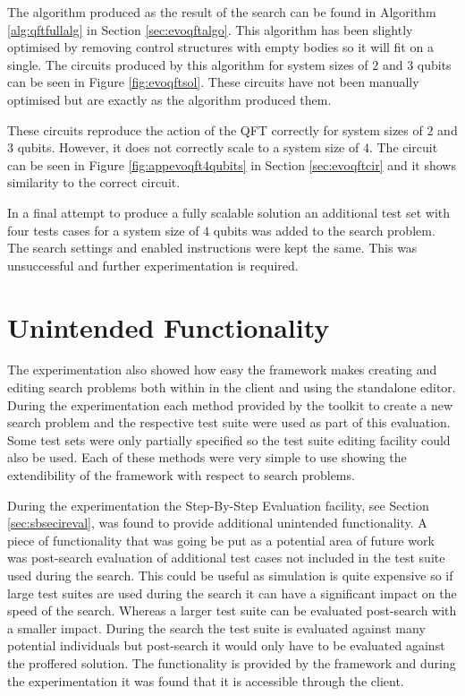The algorithm produced as the result of the search can be found in Algorithm \ref{alg:qftfullalg} in Section \ref{sec:evoqftalgo}.
This algorithm has been slightly optimised by removing control structures with empty bodies so it will fit on a single.
The circuits produced by this algorithm for system sizes of $2$ and $3$ qubits can be seen in Figure \ref{fig:evoqftsol}.
These circuits have not been manually optimised but are exactly as the algorithm produced them.

These circuits reproduce the action of the QFT correctly for system sizes of $2$ and $3$ qubits.
However, it does not correctly scale to a system size of $4$.
The circuit can be seen in Figure \ref{fig:appevoqft4qubits} in Section \ref{sec:evoqftcir} and it shows similarity to the correct circuit.

In a final attempt to produce a fully scalable solution an additional test set with four tests cases for a system size of $4$ qubits was added to the search problem.
The search settings and enabled instructions were kept the same.
This was unsuccessful and further experimentation is required.




\section{Unintended Functionality}

The experimentation also showed how easy the framework makes creating and editing search problems both within in the client and using the standalone editor.
During the experimentation each method provided by the toolkit to create a new search problem and the respective test suite were used as part of this evaluation.
Some test sets were only partially specified so the test suite editing facility could also be used.
Each of these methods were very simple to use showing the extendibility of the framework with respect to search problems.

During the experimentation the Step-By-Step Evaluation facility, see Section \ref{sec:sbsecireval}, was found to provide additional unintended functionality.
A piece of functionality that was going be put as a potential area of future work was post-search evaluation of additional test cases not included in the test suite used during the search.
This could be useful as simulation is quite expensive so if large test suites are used during the search it can have a significant impact on the speed of the search.
Whereas a larger test suite can be evaluated post-search with a smaller impact.
During the search the test suite is evaluated against many potential individuals but post-search it would only have to be evaluated against the proffered solution.
The functionality is provided by the framework and during the experimentation it was found that it is accessible through the client.

